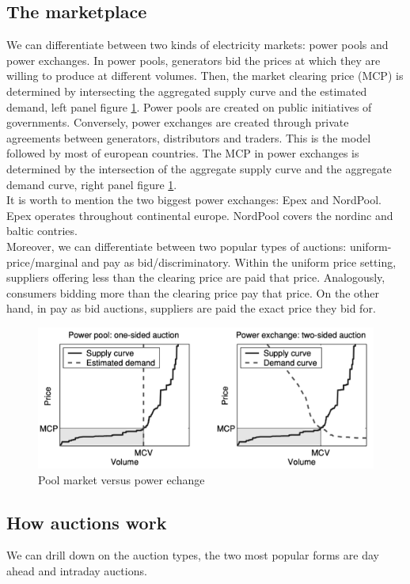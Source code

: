 \subsection{The marketplace}
We can differentiate between two kinds of electricity markets: power pools and power exchanges. In power pools, generators bid the prices at which they are willing to produce at different volumes. Then, the market clearing price (MCP) is determined by intersecting the aggregated supply curve and the estimated demand, left panel figure \ref{fig:pool_vs_echange}. Power pools are created on public initiatives of governments. Conversely, power exchanges are created through private agreements between generators, distributors and traders. This is the model followed by most of european countries.
The MCP in power exchanges is determined by the intersection of the aggregate supply curve and the aggregate demand curve, right panel figure \ref{fig:pool_vs_echange}.
\\
It is worth to mention the two biggest power exchanges: Epex and NordPool. Epex operates throughout continental europe. NordPool covers the nordinc and baltic contries.
\\
Moreover, we can differentiate between two popular types of auctions: uniform-price/marginal and pay as bid/discriminatory. Within the uniform price setting, suppliers offering less than the clearing price are paid that price. Analogously, consumers bidding more than the clearing price pay that price. On the other hand, in pay as bid auctions, suppliers are paid the exact price they bid for.


\begin{figure}[!h]
    \includegraphics[width=\textwidth]{images/pool_vs_echange.png}
    \caption{Pool market versus power echange \cite{weron2006modeling}}
    \label{fig:pool_vs_echange}
\end{figure}

\subsection{How auctions work}
We can drill down on the auction types, the two most popular forms are day ahead and intraday auctions.

